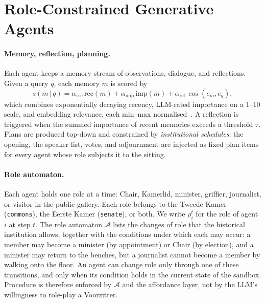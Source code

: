 \documentclass[sigconf,review,anonymous]{acmart}
\begin{document}
\section{Role-Constrained Generative Agents}
\label{sec:agents}

\paragraph{Memory, reflection, planning.} Each agent keeps a memory stream
of observations, dialogue, and reflections. Given a query $q$, each memory
$m$ is scored by
\begin{equation}
s(m\,|\,q)=\alpha_{\text{rec}}\,\text{rec}(m)+\alpha_{\text{imp}}\,\text{imp}(m)+\alpha_{\text{rel}}\,\cos(e_m,e_q),
\label{eq:retrieval}
\end{equation}
which combines exponentially decaying recency, LLM-rated importance on a
1--10 scale, and embedding relevance, each min--max
normalised~\cite{park2023generative}. A reflection is triggered when the
summed importance of recent memories exceeds a threshold $\tau$. Plans are
produced top-down and constrained by \emph{institutional schedules}: the
opening, the speaker list, votes, and adjournment are injected as fixed
plan items for every agent whose role subjects it to the sitting.

\paragraph{Role automaton.} Each agent holds one role at a time: Chair,
Kamerlid, minister, griffier, journalist, or visitor in the public gallery.
Each role belongs to the Tweede Kamer (\texttt{commons}), the Eerste Kamer
(\texttt{senate}), or both. We write $\rho_i^t$ for the role of agent $i$
at step $t$. The role automaton $\mathcal{A}$ lists the changes of role
that the historical institution allows, together with the conditions under
which each may occur: a member may become a minister (by appointment) or
Chair (by election), and a minister may return to the benches, but a
journalist cannot become a member by walking onto the floor. An agent can
change role only through one of these transitions, and only when its
condition holds in the current state of the sandbox. Procedure is
therefore enforced by $\mathcal{A}$ and the affordance layer, not by the
LLM's willingness to role-play a Voorzitter.
\end{document}
